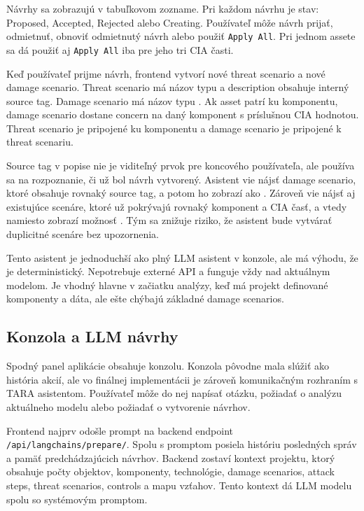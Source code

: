 \documentclass[11pt]{article}
\begin{document}
Návrhy sa zobrazujú v tabuľkovom zozname. Pri každom návrhu je stav: Proposed, Accepted, Rejected alebo Creating. Používateľ môže návrh prijať, odmietnuť, obnoviť odmietnutý návrh alebo použiť \texttt{Apply All}. Pri jednom assete sa dá použiť aj \texttt{Apply All} iba pre jeho tri CIA časti.

Keď používateľ prijme návrh, frontend vytvorí nové threat scenario a nové damage scenario. Threat scenario má názov typu  a description obsahuje interný source tag. Damage scenario má názov typu . Ak asset patrí ku komponentu, damage scenario dostane concern na daný komponent s príslušnou CIA hodnotou. Threat scenario je pripojené ku komponentu a damage scenario je pripojené k threat scenariu.

Source tag v popise nie je viditeľný prvok pre koncového používateľa, ale používa sa na rozpoznanie, či už bol návrh vytvorený. Asistent vie nájsť damage scenario, ktoré obsahuje rovnaký source tag, a potom ho zobrazí ako . Zároveň vie nájsť aj existujúce scenáre, ktoré už pokrývajú rovnaký komponent a CIA časť, a vtedy namiesto  zobrazí možnosť . Tým sa znižuje riziko, že asistent bude vytvárať duplicitné scenáre bez upozornenia.

Tento asistent je jednoduchší ako plný LLM asistent v konzole, ale má výhodu, že je deterministický. Nepotrebuje externé API a funguje vždy nad aktuálnym modelom. Je vhodný hlavne v začiatku analýzy, keď má projekt definované komponenty a dáta, ale ešte chýbajú základné damage scenarios.

\subsection{Konzola a LLM návrhy}

Spodný panel aplikácie obsahuje konzolu. Konzola pôvodne mala slúžiť ako história akcií, ale vo finálnej implementácii je zároveň komunikačným rozhraním s TARA asistentom. Používateľ môže do nej napísať otázku, požiadať o analýzu aktuálneho modelu alebo požiadať o vytvorenie návrhov.

Frontend najprv odošle prompt na backend endpoint \texttt{/api/langchains/prepare/}. Spolu s promptom posiela históriu posledných správ a pamäť predchádzajúcich návrhov. Backend zostaví kontext projektu, ktorý obsahuje počty objektov, komponenty, technológie, damage scenarios, attack steps, threat scenarios, controls a mapu vzťahov. Tento kontext dá LLM modelu spolu so systémovým promptom.
\end{document}
